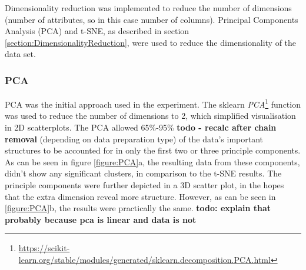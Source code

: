 
Dimensionality reduction was implemented to reduce the number of dimensions (number of attributes, so in this case number of columns). Principal Components Analysis (PCA) and t-SNE, as described in section \ref{section:DimensionalityReduction}, were used to reduce the dimensionality of the data set. 

\subsubsection{PCA}
PCA was the initial approach used in the experiment. The sklearn \textit{PCA}\footnote{\url{https://scikit-learn.org/stable/modules/generated/sklearn.decomposition.PCA.html}} function was used to reduce the number of dimensions to 2, which simplified visualisation in 2D scatterplots. The PCA allowed 65\%-95\% \textbf{todo - recalc after chain removal} (depending on data preparation type) of the data's important structures to be accounted for in only the first two or three principle components. As can be seen in figure \ref{figure:PCA}a, the resulting data from these components, didn't show any significant clusters, in comparison to the t-SNE results. The principle components were further depicted in a 3D scatter plot, in the hopes that the extra dimension reveal more structure. However, as can be seen in \ref{figure:PCA}b, the results were practically the same. \textbf{todo: explain that probably because pca is linear and data is not}

